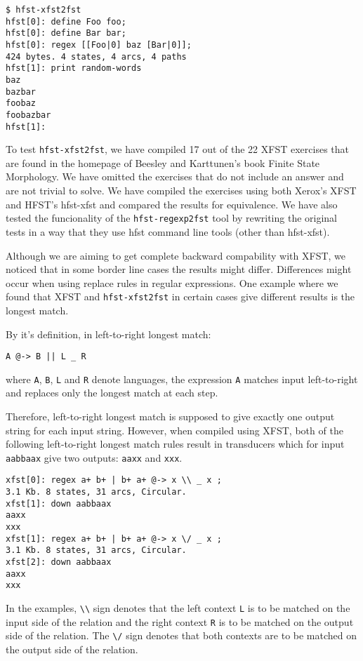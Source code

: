 \documentclass{llncs}
\begin{document}
\begin{verbatim}
$ hfst-xfst2fst 
hfst[0]: define Foo foo;
hfst[0]: define Bar bar;
hfst[0]: regex [[Foo|0] baz [Bar|0]];
424 bytes. 4 states, 4 arcs, 4 paths
hfst[1]: print random-words
baz
bazbar
foobaz
foobazbar
hfst[1]: 
\end{verbatim}

To test \verb+hfst-xfst2fst+, we have compiled 17 out of the 22 XFST exercises
that are found in the homepage of Beesley and Karttunen's book Finite
State Morphology. We have omitted the exercises that do not include an
answer and are not trivial to solve. We have compiled the exercises
using both Xerox's XFST and HFST's hfst-xfst and compared the results
for equivalence. We have also tested the funcionality of the
\verb+hfst-regexp2fst+ tool by rewriting the original tests in a way that they
use hfst command line tools (other than hfst-xfst).

Although we are aiming to get complete backward compability with XFST, we
noticed that in some border line cases the results might differ. Differences
might occur when using replace rules in regular expressions.
One example where we found that XFST and \verb+hfst-xfst2fst+ in certain cases
give different results is the longest match.


By it's definition, in left-to-right longest match: 
\begin{verbatim}
A @-> B || L _ R
\end{verbatim}
where \verb+A+, \verb+B+, \verb+L+ and \verb+R+ denote languages, the
expression \verb+A+ matches input left-to-right and replaces only the longest
match at each step.

Therefore, left-to-right longest match is supposed to give exactly one output
string for each input string. However, when compiled using XFST, both of the following left-to-right
longest match rules result in transducers which for input \verb+aabbaax+ give two outputs: \verb+aaxx+ and \verb+xxx+.
\begin{verbatim}
xfst[0]: regex a+ b+ | b+ a+ @-> x \\ _ x ;
3.1 Kb. 8 states, 31 arcs, Circular.
xfst[1]: down aabbaax
aaxx
xxx
xfst[1]: regex a+ b+ | b+ a+ @-> x \/ _ x ;
3.1 Kb. 8 states, 31 arcs, Circular.
xfst[2]: down aabbaax
aaxx
xxx
\end{verbatim}

In the examples, \verb+\\+ sign denotes that the left context \verb+L+ is to be
matched on the input side of the relation and the right context \verb+R+ is to
be matched on the output side of the relation. The \verb+\/+ sign denotes
that both contexts are to be matched on the output side of the relation.
\end{document}
